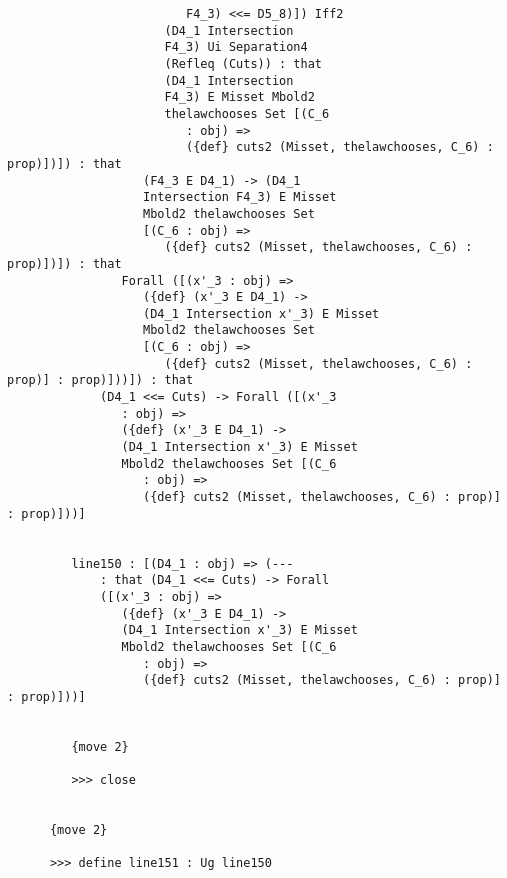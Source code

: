 \documentclass[12pt]{article}
\begin{document}
\begin{verbatim}
                         F4_3) <<= D5_8)]) Iff2 
                      (D4_1 Intersection 
                      F4_3) Ui Separation4 
                      (Refleq (Cuts)) : that 
                      (D4_1 Intersection 
                      F4_3) E Misset Mbold2 
                      thelawchooses Set [(C_6 
                         : obj) => 
                         ({def} cuts2 (Misset, thelawchooses, C_6) : prop)])]) : that 
                   (F4_3 E D4_1) -> (D4_1 
                   Intersection F4_3) E Misset 
                   Mbold2 thelawchooses Set 
                   [(C_6 : obj) => 
                      ({def} cuts2 (Misset, thelawchooses, C_6) : prop)])]) : that 
                Forall ([(x'_3 : obj) => 
                   ({def} (x'_3 E D4_1) -> 
                   (D4_1 Intersection x'_3) E Misset 
                   Mbold2 thelawchooses Set 
                   [(C_6 : obj) => 
                      ({def} cuts2 (Misset, thelawchooses, C_6) : prop)] : prop)]))]) : that 
             (D4_1 <<= Cuts) -> Forall ([(x'_3 
                : obj) => 
                ({def} (x'_3 E D4_1) -> 
                (D4_1 Intersection x'_3) E Misset 
                Mbold2 thelawchooses Set [(C_6 
                   : obj) => 
                   ({def} cuts2 (Misset, thelawchooses, C_6) : prop)] : prop)]))]


         line150 : [(D4_1 : obj) => (--- 
             : that (D4_1 <<= Cuts) -> Forall 
             ([(x'_3 : obj) => 
                ({def} (x'_3 E D4_1) -> 
                (D4_1 Intersection x'_3) E Misset 
                Mbold2 thelawchooses Set [(C_6 
                   : obj) => 
                   ({def} cuts2 (Misset, thelawchooses, C_6) : prop)] : prop)]))]


         {move 2}

         >>> close


      {move 2}

      >>> define line151 : Ug line150



\end{verbatim}
\end{document}
